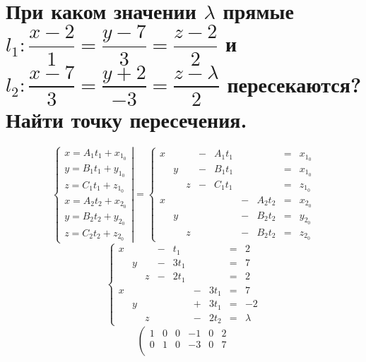\documentclass[12pt]{article}
\begin{document}
\begin{sloppypar}
    \section{При каком значении $\lambda$ прямые $l_1: \dfrac{x - 2}{1} = \dfrac{y - 7}{3} = \dfrac{z - 2}{2}$ и $l_2: \dfrac{x - 7}{3} = \dfrac{y + 2}{-3} = \dfrac{z - \lambda}{2}$ пересекаются? Найти точку пересечения.}
    \[
        \left\{\begin{array}{l}
            x = A_1t_1 + x_{1_0} \\
            y = B_1t_1 + y_{1_0} \\
            z = C_1t_1 + z_{1_0} \\
            x = A_2t_2 + x_{2_0} \\
            y = B_2t_2 + y_{2_0} \\
            z = C_2t_2 + z_{2_0}
        \end{array}\right|
        =
        \left\{\begin{array}{rcrcrcrcl}
            x &   &   & - & A_1t_1 &   &        & = & x_{1_0} \\
              & y &   & - & B_1t_1 &   &        & = & x_{1_0} \\
              &   & z & - & C_1t_1 &   &        & = & z_{1_0} \\
            x &   &   &   &        & - & A_2t_2 & = & x_{2_0} \\
              & y &   &   &        & - & B_2t_2 & = & y_{2_0} \\
              &   & z &   &        & - & B_2t_2 & = & z_{2_0}
        \end{array}\right.
    \]
    \[
        \left\{\begin{array}{rcrcrcrcl}
            x &   &   & - & t_1  &   &      & = & 2       \\
              & y &   & - & 3t_1 &   &      & = & 7       \\
              &   & z & - & 2t_1 &   &      & = & 2       \\
            x &   &   &   &      & - & 3t_1 & = & 7       \\
              & y &   &   &      & + & 3t_1 & = & -2      \\
              &   & z &   &      & - & 2t_2 & = & \lambda
        \end{array}\right.
    \]
    \[
        \left(\begin{array}{ccccc|c}
                1 & 0 & 0 & -1 & 0  & 2       \\
                0 & 1 & 0 & -3 & 0  & 7       \\

\end{array}\]
\end{sloppypar}
\end{document}
